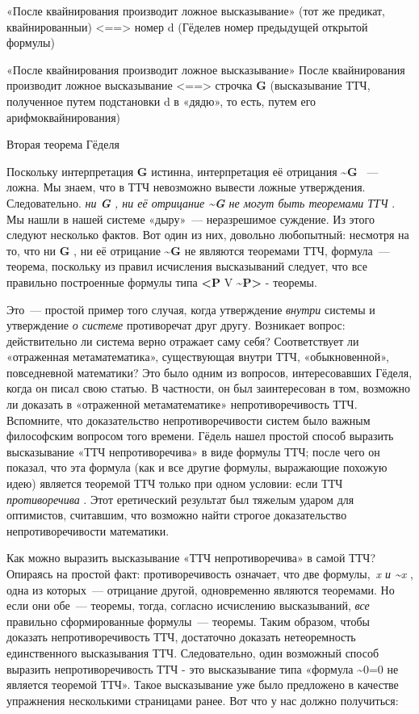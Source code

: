 \documentclass[../main.tex]{subfiles}
\begin{document}
«После квайнирования производит ложное высказывание» (тот же предикат, квайнированныи) \textless==\textgreater{} номер d (Гёделев номер предыдущей открытой формулы)

«После квайнирования производит ложное высказывание» После квайнирования производит ложное высказывание \textless==\textgreater{} строчка \textbf{G} (высказывание ТТЧ, полученное путем подстановки d в «дядю», то есть, путем его арифмоквайнирования)

Вторая теорема Гёделя

Поскольку интерпретация \textbf{G} истинна, интерпретация её отрицания \textbf{\textasciitilde G} ~--- ложна. Мы знаем, что в ТТЧ невозможно вывести ложные утверждения. Следовательно. \emph{ни \textbf{G} , ни её отрицание \textbf{\textasciitilde G} не могут быть теоремами ТТЧ} . Мы нашли в нашей системе «дыру»~--- неразрешимое суждение. Из этого следуют несколько фактов. Вот один из них, довольно любопытный: несмотря на то, что ни \textbf{G} , ни её отрицание \textbf{\textasciitilde G} не являются теоремами ТТЧ, формула~--- теорема, поскольку из правил исчисления высказываний следует, что все правильно построенные формулы типа \textbf{\textless P} V \textbf{\textasciitilde P\textgreater{}} - теоремы.

Это~--- простой пример того случая, когда утверждение \emph{внутри} системы и утверждение \emph{о системе} противоречат друг другу. Возникает вопрос: действительно ли система верно отражает саму себя? Соответствует ли «отраженная метаматематика», существующая внутри ТТЧ, «обыкновенной», повседневной математики? Это было одним из вопросов, интересовавших Гёделя, когда он писал свою статью. В частности, он был заинтересован в том, возможно ли доказать в «отраженной метаматематике» непротиворечивость ТТЧ\@. Вспомните, что доказательство непротиворечивости систем было важным философским вопросом того времени. Гёдель нашел простой способ выразить высказывание «ТТЧ непротиворечива» в виде формулы ТТЧ; после чего он показал, что эта формула (как и все другие формулы, выражающие похожую идею) является теоремой ТТЧ только при одном условии: если ТТЧ \emph{противоречива} . Этот еретический результат был тяжелым ударом для оптимистов, считавшим, что возможно найти строгое доказательство непротиворечивости математики.

Как можно выразить высказывание «ТТЧ непротиворечива» в самой ТТЧ? Опираясь на простой факт: противоречивость означает, что две формулы,~\emph{x и \textasciitilde x} , одна из которых~--- отрицание другой, одновременно являются теоремами. Но если они обе~--- теоремы, тогда, согласно исчислению высказываний, \emph{все} правильно сформированные формулы~--- теоремы. Таким образом, чтобы доказать непротиворечивость ТТЧ, достаточно доказать нетеоремность единственного высказывания ТТЧ\@. Следовательно, один возможный способ выразить непротиворечивость ТТЧ - это высказывание типа «формула \textasciitilde0=0 не является теоремой ТТЧ». Такое высказывание уже было предложено в качестве упражнения несколькими страницами ранее. Вот что у нас должно получиться:
\end{document}
